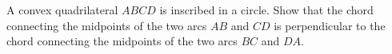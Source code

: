 A convex quadrilateral $ABCD$ is inscribed in a circle.
Show that the chord connecting the midpoints of the two arcs $AB$ and $CD$ is perpendicular
to the chord connecting the midpoints of the two arcs $BC$ and $DA$.